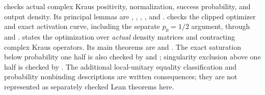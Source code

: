  checks actual complex Kraus positivity,
normalization, success probability, and output density. Its principal
lemmas are ,
,
,
, and
.
 checks the clipped optimizer and exact
activation curve, including the separate $p_0=1/2$ argument, through
 and
.
 states the optimization over
\emph{actual} density matrices and contracting complex Kraus operators.
Its main theorems are  and
.
The exact saturation below probability one half is also checked by
 and
; singularity exclusion above
one half is checked by
.
The additional local-unitary equality classification and probability
nonbinding descriptions are written consequences; they are not represented
as separately checked Lean theorems here.
